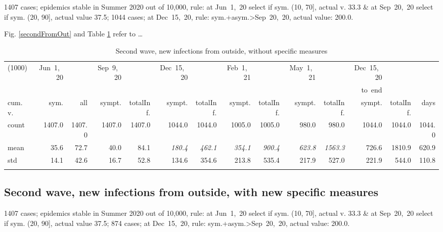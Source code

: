 \documentclass[graybox]{svmult}
\begin{document}
1407 cases; epidemics stable in Summer 2020 out of 10,000, rule: at Jun~1,~20 select if sym. (10, 70], actual v. 33.3 \& at Sep~20,~20 select if sym. (20, 90], actual value 37.5; 1044 cases; at Dec~15,~20, rule: sym.+asym.>Sep~20,~20, actual value: 200.0.

Fig. \ref{secondFromOut} and Table \ref{selForceWave2Tab} refer to \ldots

\begin{table}[t]
\center
\tiny
\begin{tabular}{lrrrrrrrrrrrrr}
\hline\noalign{\smallskip}
(1000) & Jun~1,~20 & & Sep~9,~20 & & Dec~15,~20 & & Feb~1,~21 & & May~1,~21 & & Dec~15,~20 \\
& & & & & & & & & & & to~end \\
cum.~v. & sym. & all & sympt. & totalInf. & sympt. & totalInf. & sympt. & totalInf. & sympt. & totalInf. & sympt. & totalInf. & days\\
\noalign{\smallskip}\svhline\noalign{\smallskip}
count & 1407.0 & 1407.0 & 1407.0 & 1407.0 & 1044.0 & 1044.0 & 1005.0 & 1005.0 & 980.0 & 980.0 & 1044.0 & 1044.0 & 1044.0 \\
mean & 35.6 & 72.7 & 40.0 & 84.1 & \emph{180.4} & \emph{462.1} & \emph{354.1} & \emph{900.4} & \emph{623.8} & \emph{1563.3} & 726.6 & 1810.9 & 620.9 \\
std & 14.1 & 42.6 & 16.7 & 52.8 & 134.6 & 354.6 & 213.8 & 535.4 & 217.9 & 527.0 & 221.9 & 544.0 & 110.8 \\
\hline\noalign{\smallskip}
\end{tabular}
\caption{Second wave, new infections from outside, without specific measures}
\label{selForceWave2Tab}
\end{table}



\subsection{Second wave, new infections from outside, with new specific measures}
\label{secondWith}

1407 cases; epidemics stable in Summer 2020 out of 10,000, rule: at Jun~1,~20 select if sym. (10, 70], actual v. 33.3 \& at Sep~20,~20 select if sym. (20, 90], actual value 37.5; 874 cases; at Dec~15,~20, rule: sym.+asym.>Sep~20,~20, actual value: 200.0.
\end{document}
